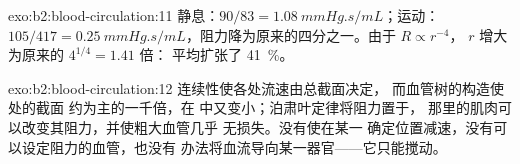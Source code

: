 \begin{solution}{exo:b2:blood-circulation:11}
静息：$90/83 = \qty{1.08}{mmHg.s/mL}$；运动：$105/417 =
\qty{0.25}{mmHg.s/mL}$，阻力降为原来的四分之一。由于 $R \propto r^{-4}$，
$r$ 增大为原来的 $4^{1/4} = 1.41$ 倍：
平均扩张了 \qty{41}{\%}。
\end{solution}

\begin{solution}{exo:b2:blood-circulation:12}
连续性使各处流速由总截面决定，
而血管树的构造使处的截面
约为主的一千倍，在
中又变小；泊肃叶定律将阻力置于，
那里的肌肉可以改变其阻力，并使粗大血管几乎
无损失。没有使在某一
确定位置减速，没有可以设定阻力的血管，也没有
办法将血流导向某一器官——它只能搅动。
\end{solution}

